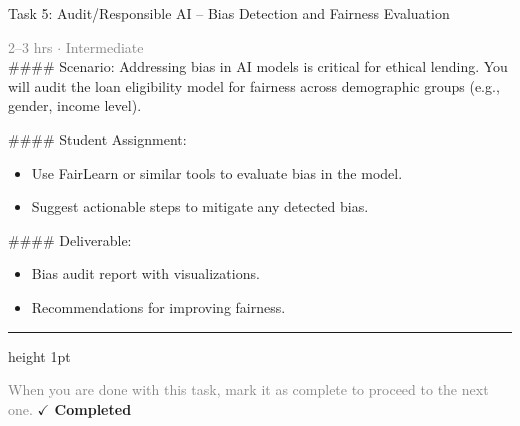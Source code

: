 \documentclass[10pt,a4paper]{article}
\begin{document}
\begin{taskbox}{Task 5: Audit/Responsible AI – Bias Detection and Fairness Evaluation}

    {\small \textcolor{gray}{2--3 hrs $\cdot$ Intermediate}}\\[12pt]

    \#\#\#\# Scenario:
Addressing bias in AI models is critical for ethical lending. You will audit the loan eligibility model for fairness across demographic groups (e.g., gender, income level).

\#\#\#\# Student Assignment:
\begin{itemize}
    \item Use FairLearn or similar tools to evaluate bias in the model.
    \item Suggest actionable steps to mitigate any detected bias.
\end{itemize}

\#\#\#\# Deliverable:
\begin{itemize}
    \item Bias audit report with visualizations.
    \item Recommendations for improving fairness.\par
\end{itemize}

    \vspace{16pt}

    \textcolor{cardBorder}{\hrule height 1pt}\vspace{8pt}

    \small \textcolor{gray}{When you are done with this task, mark it as complete to proceed to the next one.} \hfill \textbf{\textcolor{brandDark}{$\checkmark$ Completed}}

\end{taskbox}
\end{document}
